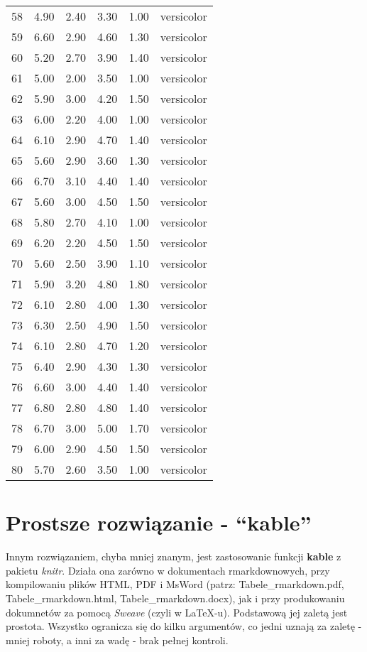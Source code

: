 \documentclass[a4paper, 10pt]{article}\usepackage[]{graphicx}\usepackage[]{color}
\begin{document}
{\begin{longtable}{rrrrrl}
  58 & 4.90 & 2.40 & 3.30 & 1.00 & versicolor \\ 
  59 & 6.60 & 2.90 & 4.60 & 1.30 & versicolor \\ 
  60 & 5.20 & 2.70 & 3.90 & 1.40 & versicolor \\ 
  61 & 5.00 & 2.00 & 3.50 & 1.00 & versicolor \\ 
  62 & 5.90 & 3.00 & 4.20 & 1.50 & versicolor \\ 
  63 & 6.00 & 2.20 & 4.00 & 1.00 & versicolor \\ 
  64 & 6.10 & 2.90 & 4.70 & 1.40 & versicolor \\ 
  65 & 5.60 & 2.90 & 3.60 & 1.30 & versicolor \\ 
  66 & 6.70 & 3.10 & 4.40 & 1.40 & versicolor \\ 
  67 & 5.60 & 3.00 & 4.50 & 1.50 & versicolor \\ 
  68 & 5.80 & 2.70 & 4.10 & 1.00 & versicolor \\ 
  69 & 6.20 & 2.20 & 4.50 & 1.50 & versicolor \\ 
  70 & 5.60 & 2.50 & 3.90 & 1.10 & versicolor \\ 
  71 & 5.90 & 3.20 & 4.80 & 1.80 & versicolor \\ 
  72 & 6.10 & 2.80 & 4.00 & 1.30 & versicolor \\ 
  73 & 6.30 & 2.50 & 4.90 & 1.50 & versicolor \\ 
  74 & 6.10 & 2.80 & 4.70 & 1.20 & versicolor \\ 
  75 & 6.40 & 2.90 & 4.30 & 1.30 & versicolor \\ 
  76 & 6.60 & 3.00 & 4.40 & 1.40 & versicolor \\ 
  77 & 6.80 & 2.80 & 4.80 & 1.40 & versicolor \\ 
  78 & 6.70 & 3.00 & 5.00 & 1.70 & versicolor \\ 
  79 & 6.00 & 2.90 & 4.50 & 1.50 & versicolor \\ 
  80 & 5.70 & 2.60 & 3.50 & 1.00 & versicolor \\ 
   \hline
\hline
\end{longtable}
}


\section{Prostsze rozwiązanie - ``kable''}

Innym rozwiązaniem, chyba mniej znanym, jest zastosowanie funkcji \textbf{kable} z pakietu \emph{knitr}. Działa ona zarówno w dokumentach rmarkdownowych, przy kompilowaniu plików HTML, PDF i MsWord (patrz: Tabele\_rmarkdown.pdf, Tabele\_rmarkdown.html, Tabele\_rmarkdown.docx), jak i przy produkowaniu dokumnetów za pomocą \emph{Sweave} (czyli w LaTeX-u). Podstawową jej zaletą jest prostota. Wszystko ogranicza się do kilku argumentów, co jedni uznają za zaletę - mniej roboty, a inni za wadę - brak pełnej kontroli. 
\end{document}
